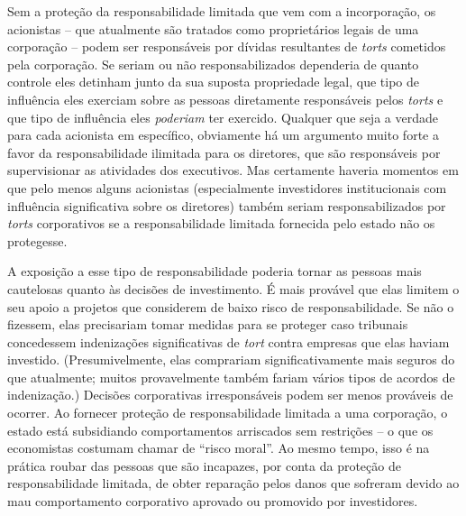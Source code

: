 Sem a proteção da responsabilidade limitada que vem com a incorporação, os acionistas -- que atualmente são tratados como proprietários legais de uma corporação -- podem ser responsáveis por dívidas resultantes de \emph{torts} cometidos pela corporação. Se seriam ou não responsabilizados dependeria de quanto controle eles detinham junto da sua suposta propriedade legal, que tipo de influência eles exerciam sobre as pessoas diretamente responsáveis pelos \emph{torts} e que tipo de influência eles \emph{poderiam} ter exercido. Qualquer que seja a verdade para cada acionista em específico, obviamente há um argumento muito forte a favor da responsabilidade ilimitada para os diretores, que são responsáveis por supervisionar as atividades dos executivos. Mas certamente haveria momentos em que pelo menos alguns acionistas (especialmente investidores institucionais com influência significativa sobre os diretores) também seriam responsabilizados por \emph{torts} corporativos se a responsabilidade limitada fornecida pelo estado não os protegesse.

A exposição a esse tipo de responsabilidade poderia tornar as pessoas mais cautelosas quanto às decisões de investimento. É mais provável que elas limitem o seu apoio a projetos que considerem de baixo risco de responsabilidade. Se não o fizessem, elas precisariam tomar medidas para se proteger caso tribunais concedessem indenizações significativas de \emph{tort} contra empresas que elas haviam investido. (Presumivelmente, elas comprariam significativamente mais seguros do que atualmente; muitos provavelmente também fariam vários tipos de acordos de indenização.) Decisões corporativas irresponsáveis podem ser menos prováveis de ocorrer. Ao fornecer proteção de responsabilidade limitada a uma corporação, o estado está subsidiando comportamentos arriscados sem restrições -- o que os economistas costumam chamar de ``risco moral''. Ao mesmo tempo, isso é na prática roubar das pessoas que são incapazes, por conta da proteção de responsabilidade limitada, de obter reparação pelos danos que sofreram devido ao mau comportamento corporativo aprovado ou promovido por investidores. 

